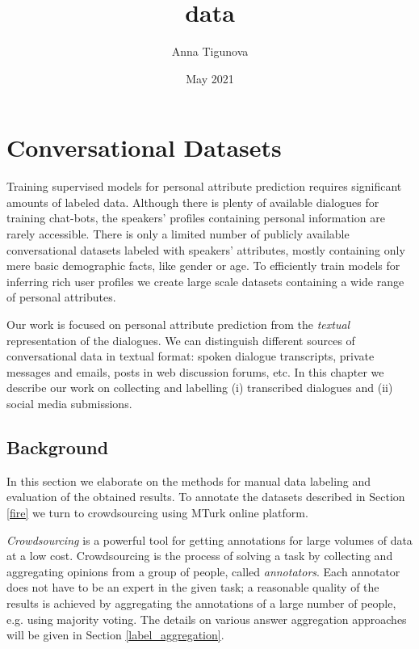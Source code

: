 \documentclass[11pt, oneside]{book}
\title{data}
\author{Anna Tigunova}
\date{May 2021}
\begin{document}
\chapter{Conversational Datasets}

Training supervised models for personal attribute prediction requires significant amounts of labeled data. Although there is plenty of available dialogues for training chat-bots, the speakers' profiles containing personal information are rarely accessible. There is only a limited number of publicly available conversational datasets labeled with speakers' attributes, mostly containing only mere basic demographic facts, like gender or age. To efficiently train models for inferring rich user profiles we create large scale datasets containing a wide range of personal attributes.

Our work is focused on personal attribute prediction from the \textit{textual} representation of the dialogues. We can distinguish different sources of conversational data in textual format: spoken dialogue transcripts, private messages and emails, posts in web discussion forums, etc. In this chapter we describe our work on collecting and labelling (i) transcribed dialogues and (ii) social media submissions.


\section{Background}

In this section we elaborate on the methods for manual data labeling and evaluation of the obtained results. To annotate the datasets described in Section \ref{fire} we turn to crowdsourcing using MTurk online platform.

\textit{Crowdsourcing} is a powerful tool for getting annotations for large volumes of data at a low cost. Crowdsourcing is the process of solving a task by collecting and aggregating opinions from a group of people, called \textit{annotators}. Each annotator does not have to be an expert in the given task; a reasonable quality of the results is achieved by aggregating the annotations of a large number of people, e.g. using majority voting. The details on various answer aggregation approaches will be given in Section \ref{label_aggregation}.
\end{document}
